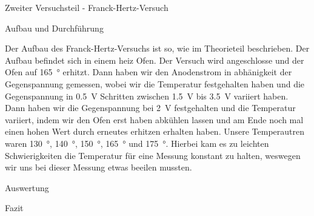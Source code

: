 \documentclass[pdftex, a4paper,11pt, twoside, ngerman]{report}
\begin{document}
  \begin{chapter}{Zweiter Versuchsteil - Franck-Hertz-Versuch}
    \label{chp:Balmer}
 
 
    \begin{section}{Aufbau und Durchführung}
      \label{chp:Balmer:sec:Aufbau}
      
      Der Aufbau des Franck-Hertz-Versuchs ist so, wie im Theorieteil beschrieben.
      Der Aufbau befindet sich in einem heiz Ofen. 
      Der Versuch wird angeschlosse und der Ofen auf \SI{165}{\degree} erhitzt.
      Dann haben wir den Anodenstrom in abhänigkeit der Gegenspannung gemessen, wobei wir die Temperatur festgehalten haben und die Gegenspannung in \SI{0,5}{\volt} Schritten zwischen \SI{1,5}{\volt} bis \SI{3,5}{\volt} variiert haben.
      Dann haben wir die Gegenspannung bei \SI{2}{\volt} festgehalten und die Temperatur variiert, indem wir den Ofen erst haben abkühlen lassen und am Ende noch mal einen hohen Wert durch erneutes erhitzen erhalten haben. 
      Unsere Temperautren waren \SI{130}{\degree}, \SI{140}{\degree}, \SI{150}{\degree}, \SI{165}{\degree} und \SI{175}{\degree}.
      Hierbei kam es zu leichten Schwierigkeiten die Temperatur für eine Messung konstant zu halten, weswegen wir uns bei dieser Messung etwas beeilen mussten. 

      
    \end{section}

    \begin{section}{Auswertung}
      \label{chp:Balmer:sec:Auswertung}
      
      
     
    \end{section}
   
   
   
    \begin{section}{Fazit}
      \label{chp:Balmer:sec:Fazit}
      
      
      
    \end{section}
   
  \end{chapter}
  
  
  
  
  
  
  
  \begin{thebibliography}{99}
    \scriptsize
    
   
  \end{thebibliography}
 
\end{document}
